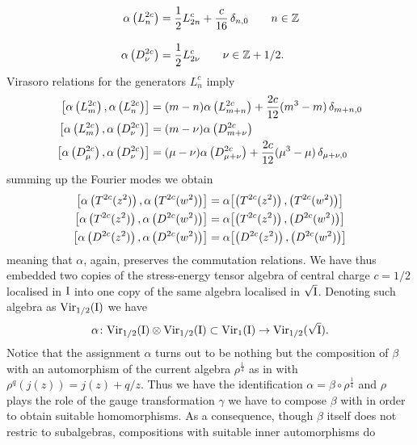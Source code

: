  \begin{align*}
 \alpha\left(L_n^{2c}\right)&=\frac{1}{2}L_{2n}^c+\frac{c}{16}\,
 \delta_{n,0}\qquad n\in\Z\\[2ex]
 \alpha\left(D_{\nu}^{2c}\right)&=\frac{1}{2}L_{2\nu}^c
 \qquad \nu\in\Z+1/2.
 \end{align*}
 Virasoro relations for the generators $L_n^c$ imply
 \begin{align*}
 \comm*{\alpha\left(L_m^{2c}\right),\alpha\left(L_n^{2c}\right)}&
 =(m-n)\alpha\left(L_{m+n}^{2c}\right)+\frac{2c}{12}(m^3-m)\,
 \delta_{m+n,0}\\
 \comm*{\alpha\left(L_m^{2c}\right),\alpha\left(D_{\nu}^{2c}\right)}&
 =(m-\nu)\alpha\left(D_{m+\nu}^{2c}\right)\\
 \comm*{\alpha\left(D_{\mu}^{2c}\right),\alpha\left(D_{\nu}^{2c}\right)}&
 =(\mu-\nu)\alpha\left(D_{\mu+\nu}^{2c}\right)+\frac{2c}{12}(\mu^3-\mu)\,
 \delta_{\mu+\nu,0}
 \end{align*}
 summing up the Fourier modes we obtain 
 \begin{align*}
 \comm*{\alpha\left(T^{2c}(z^2)\right),\alpha\left(T^{2c}(w^2)\right)}&=
 \alpha\comm*{\left(T^{2c}(z^2)\right),\left(T^{2c}(w^2)\right)}\\
 \comm*{\alpha\left(T^{2c}(z^2)\right),\alpha\left(D^{2c}(w^2)\right)}&=
 \alpha\comm*{\left(T^{2c}(z^2)\right),\left(D^{2c}(w^2)\right)}\\
 \comm*{\alpha\left(D^{2c}(z^2)\right),\alpha\left(D^{2c}(w^2)\right)}&=
 \alpha\comm*{\left(D^{2c}(z^2)\right),\left(D^{2c}(w^2)\right)}
 \end{align*}
 meaning that $\alpha$, again, preserves the commutation relations. We 
 have thus embedded two copies of the stress-energy tensor algebra
 of central charge $c=1/2$ localised in $\I$ into one copy
 of the same algebra localised in $\sqrt{\I}$. Denoting such algebra
 as $\textrm{Vir}_{1/2}(\I)$ we have
 \[
 \alpha\colon\textrm{Vir}_{1/2}(\I)\otimes\textrm{Vir}_{1/2}(\I)
 \subset \textrm{Vir}_{1}(\I)\to\textrm{Vir}_{1/2}(\sqrt{\I}).
 \]
 Notice that the assignment $\alpha$ turns out to be nothing
 but the composition of $\beta$ with an automorphism of the current
 algebra $\rho^{\frac{1}{4}}$ as in \cite{Rehren:2012wa} 
 with $\rho^q(j(z))=j(z)+q/z$. Thus we have the 
 identification $\alpha=\beta\circ\rho^{\frac{1}{4}}$ and $\rho$ 
 plays the role of the gauge transformation $\gamma$ we have to compose 
 $\beta$ with in order to obtain suitable homomorphisms. 
 As a consequence, though $\beta$ itself does not restric to
 subalgebras, compositions with suitable inner automorphisms do 
